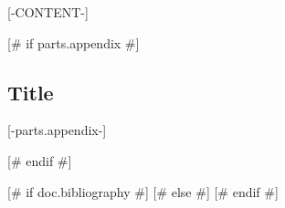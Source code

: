 \documentclass[qe,nameyear,draft]{econsocart}
[# elif options.final #]
\begin{document}
[-CONTENT-]

[# if parts.appendix #]
\begin{appendix}
\section*{Title}\label{appn} %
[-parts.appendix-]
\end{appendix}
[# endif #]

[# if doc.bibliography #]
[# else #]
[# endif #]
\end{document}

